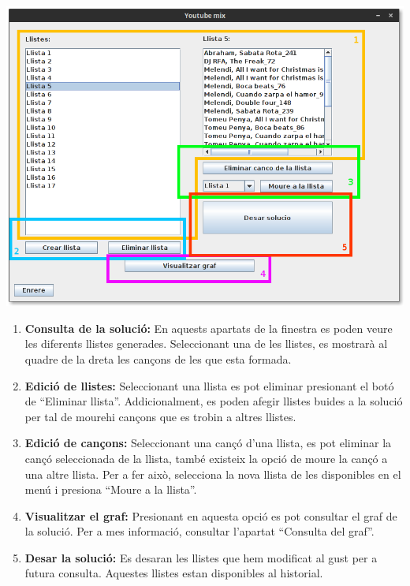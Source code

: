 \documentclass[letterpaper,10pt,oneside]{sphinxmanual}
\begin{document}
\includegraphics{edit_llist.png}
\begin{enumerate}
\item {} 
\textbf{Consulta de la solució:} En aquests apartats de la finestra es poden veure les diferents llistes generades. Seleccionant una de les llistes, es mostrarà al quadre de la dreta les cançons de les que esta formada.

\item {} 
\textbf{Edició de llistes:} Seleccionant una llista es pot eliminar presionant el botó de ``Eliminar llista''. Addicionalment, es poden afegir llistes buides a la solució per tal de mourehi cançons que es trobin a altres llistes.

\item {} 
\textbf{Edició de cançons:} Seleccionant una cançó d'una llista, es pot eliminar la cançó seleccionada de la llista, també existeix la opció de moure la cançó a una altre llista. Per a fer això, selecciona la nova llista de les disponibles en el menú i presiona ``Moure a la llista''.

\item {} 
\textbf{Visualitzar el graf:} Presionant en aquesta opció es pot consultar el graf de la solució. Per a mes informació, consultar l'apartat ``Consulta del graf''.

\item {} 
\textbf{Desar la solució:} Es desaran les llistes que hem modificat al gust per a futura consulta. Aquestes llistes estan disponibles al historial.

\end{enumerate}
\end{document}
